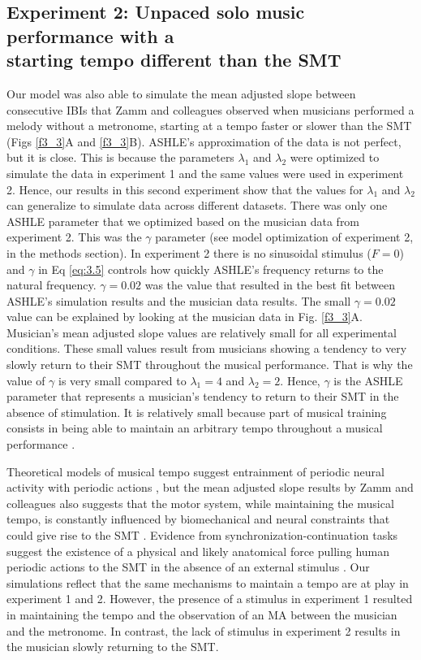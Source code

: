 \documentclass{report}
\begin{document}
\subsection{Experiment 2: Unpaced solo music performance with a \\ starting tempo different than the SMT}

Our model was also able to simulate the mean adjusted slope between consecutive IBIs that Zamm and colleagues \cite{zamm2018musicians} observed when musicians performed a melody without a metronome, starting at a tempo faster or slower than the SMT (Figs \ref{f3_3}A and \ref{f3_3}B). ASHLE's approximation of the data is not perfect, but it is close. This is because the parameters $\lambda_1$ and $\lambda_2$ were optimized to simulate the data in experiment 1 and the same values were used in experiment 2. Hence, our results in this second experiment show that the values for $\lambda_1$ and $\lambda_2$ can generalize to simulate data across different datasets. There was only one ASHLE parameter that we optimized based on the musician data from experiment 2. This was the $\gamma$ parameter (see model optimization of experiment 2, in the methods section). In experiment 2 there is no sinusoidal stimulus ($F=0$) and $\gamma$ in Eq \eqref{eq:3.5} controls how quickly ASHLE's frequency returns to the natural frequency. $\gamma = 0.02$ was the value that resulted in the best fit between ASHLE's simulation results and the musician data results. The small $\gamma=0.02$ value can be explained by looking at the musician data in Fig.{} \ref{f3_3}A. Musician's mean adjusted slope values are relatively small for all experimental conditions. These small values result from musicians showing a tendency to very slowly return to their SMT throughout the musical performance. That is why the value of $\gamma$ is very small compared to $\lambda_1=4$ and $\lambda_2=2$. Hence, $\gamma$ is the ASHLE parameter that represents a musician's tendency to return to their SMT in the absence of stimulation. It is relatively small because part of musical training consists in being able to maintain an arbitrary tempo throughout a musical performance \cite{fine2009memory, schultz2019roles}.

Theoretical models of musical tempo suggest entrainment of periodic neural activity with periodic actions \cite{large1999dynamics}, but the mean adjusted slope results by Zamm and colleagues \cite{zamm2018musicians} also suggests that the motor system, while maintaining the musical tempo, is constantly influenced by biomechanical and neural constraints that could give rise to the SMT \cite{goodman2000advantages}. Evidence from synchronization-continuation tasks suggest the existence of a physical and likely anatomical force pulling human periodic actions to the SMT in the absence of an external stimulus \cite{yu2003task, mcauley2006time}. Our simulations reflect that the same mechanisms to maintain a tempo are at play in experiment 1 and 2. However, the presence of a stimulus in experiment 1 resulted in maintaining the tempo and the observation of an MA between the musician and the metronome. In contrast, the lack of stimulus in experiment 2 results in the musician slowly returning to the SMT.
\end{document}
